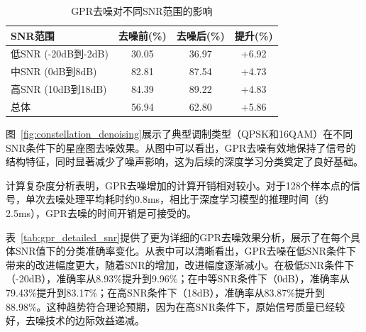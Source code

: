 \documentclass[conference]{IEEEtran}
\begin{document}
\begin{table}[h]
\centering
\caption{GPR去噪对不同SNR范围的影响}
\label{tab:gpr_impact}
\begin{tabular}{@{}lccc@{}}
\toprule
SNR范围 & 去噪前(\%) & 去噪后(\%) & 提升(\%) \\
\midrule
低SNR (-20dB到-2dB) & 30.05 & 36.97 & +6.92 \\
中SNR (0dB到8dB) & 82.81 & 87.54 & +4.73 \\
高SNR (10dB到18dB) & 84.39 & 89.22 & +4.83 \\
总体 & 
56.94 & 62.80 & +5.86 \\
\bottomrule
\end{tabular}
\end{table}

图~\ref{fig:constellation_denoising}展示了典型调制类型（QPSK和16QAM）在不同SNR条件下的星座图去噪效果。从图中可以看出，GPR去噪有效地保持了信号的结构特征，同时显著减少了噪声影响，这为后续的深度学习分类奠定了良好基础。

计算复杂度分析表明，GPR去噪增加的计算开销相对较小。对于128个样本点的信号，单次去噪处理平均耗时约0.8ms，相比于深度学习模型的推理时间（约2.5ms），GPR去噪的时间开销是可接受的。

表~\ref{tab:gpr_detailed_snr}提供了更为详细的GPR去噪效果分析，展示了在每个具体SNR值下的分类准确率变化。从表中可以清晰看出，GPR去噪在低SNR条件下带来的改进幅度更大，随着SNR的增加，改进幅度逐渐减小。在极低SNR条件下（-20dB），准确率从8.93\%提升到9.96\%；在中等SNR条件下（0dB），准确率从79.43\%提升到83.17\%；在高SNR条件下（18dB），准确率从83.87\%提升到88.98\%。这种趋势符合理论预期，因为在高SNR条件下，原始信号质量已经较好，去噪技术的边际效益递减。
\end{document}
